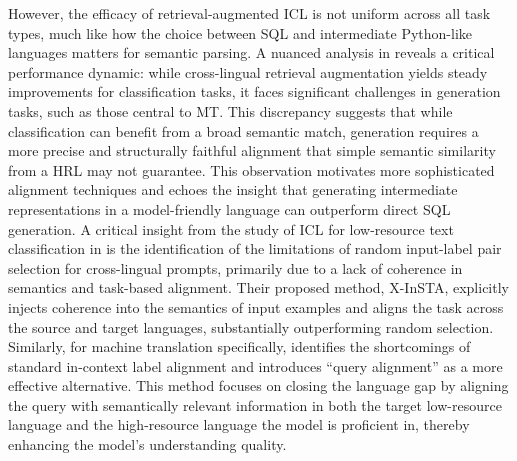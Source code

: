 \documentclass[11pt]{article}
\begin{document}
However, the efficacy of retrieval-augmented ICL is not uniform across all task types, much like how the choice between SQL and intermediate Python-like languages matters for semantic parsing. A nuanced analysis in \cite{ref536} reveals a critical performance dynamic: while cross-lingual retrieval augmentation yields steady improvements for classification tasks, it faces significant challenges in generation tasks, such as those central to MT. This discrepancy suggests that while classification can benefit from a broad semantic match, generation requires a more precise and structurally faithful alignment that simple semantic similarity from a HRL may not guarantee. This observation motivates more sophisticated alignment techniques and echoes the insight that generating intermediate representations in a model-friendly language can outperform direct SQL generation. A critical insight from the study of ICL for low-resource text classification in \cite{ref538} is the identification of the limitations of random input-label pair selection for cross-lingual prompts, primarily due to a lack of coherence in semantics and task-based alignment. Their proposed method, X-InSTA, explicitly injects coherence into the semantics of input examples and aligns the task across the source and target languages, substantially outperforming random selection. Similarly, for machine translation specifically, \cite{ref539} identifies the shortcomings of standard in-context label alignment and introduces ``query alignment'' as a more effective alternative. This method focuses on closing the language gap by aligning the query with semantically relevant information in both the target low-resource language and the high-resource language the model is proficient in, thereby enhancing the model's understanding quality.
\end{document}
